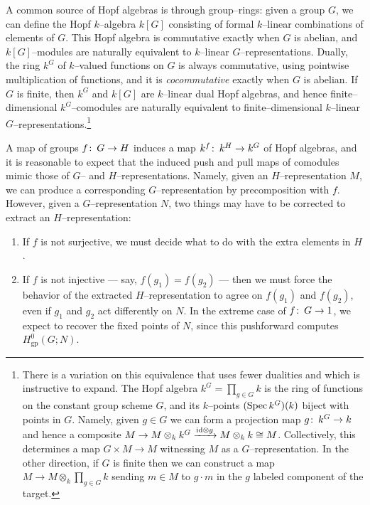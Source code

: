 \begin{example}\label{HopfAlgebrasFromFiniteGroups}
A common source of Hopf algebras is through group--rings: given a group $G$, we can define the Hopf $k$--algebra $k[G]$ consisting of formal $k$--linear combinations of elements of $G$.  This Hopf algebra is commutative exactly when $G$ is abelian, and $k[G]$--modules are naturally equivalent to $k$--linear $G$--representations.  Dually, the ring $k^G$ of $k$--valued functions on $G$ is always commutative, using pointwise multiplication of functions, and it is \emph{cocommutative} exactly when $G$ is abelian.  If $G$ is finite, then $k^G$ and $k[G]$ are $k$--linear dual Hopf algebras, and hence finite--dimensional $k^G$--comodules are naturally equivalent to finite--dimensional $k$--linear $G$--representations.\footnote{There is a variation on this equivalence that uses fewer dualities and which is instructive to expand.  The Hopf algebra $k^G = \prod_{g \in G} k$ is the ring of functions on the constant group scheme $G$, and its $k$--points $(\operatorname{Spec} k^G)(k)$ biject with points in $G$.  Namely, given $g \in G$ we can form a projection map $g\colon\thinspace k^G \to k$ and hence a composite $M \to M \otimes_k k^G \xrightarrow{\mathrm{id} \otimes g} M \otimes_k k \cong M$.  Collectively, this determines a map $G \times M \to M$ witnessing $M$ as a $G$--representation.  In the other direction, if $G$ is finite then we can construct a map $M \to M \otimes_k \prod_{g \in G} k$ sending $m \in M$ to $g \cdot m$ in the $g${\th} labeled component of the target.}

A map of groups $f\colon\thinspace G \to H$ induces a map $k^f\colon\thinspace k^H \to k^G$ of Hopf algebras, and it is reasonable to expect that the induced push and pull maps of comodules mimic those of $G$-- and $H$--representations.  Namely, given an $H$--representation $M$, we can produce a corresponding $G$--representation by precomposition with $f$.  However, given a $G$--representation $N$, two things may have to be corrected to extract an $H$--representation:
\begin{enumerate}
\item If $f$ is not surjective, we must decide what to do with the extra elements in $H$.
\item If $f$ is not injective --- say, $f(g_1) = f(g_2)$ --- then we must force the behavior of the extracted $H$--representation to agree on $f(g_1)$ and $f(g_2)$, even if $g_1$ and $g_2$ act differently on $N$.  In the extreme case of $f\colon\thinspace G \to 1$, we expect to recover the fixed points of $N$, since this pushforward computes $H^0_{\mathrm{gp}}(G; N)$.
\end{enumerate}
\end{example}

